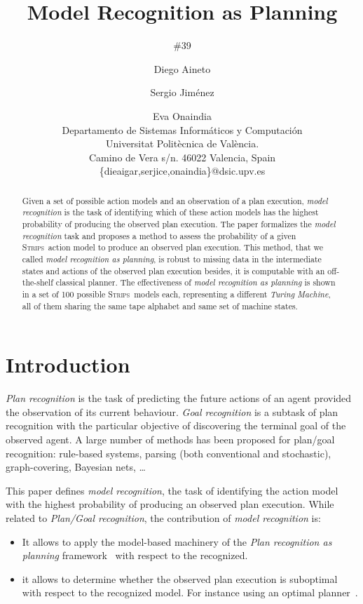 \documentclass[letterpaper]{article} %
\newcommand{\strips}{\textsc{Strips}}     %
\begin{document}
\title{Model Recognition as Planning}
\author{\#39}


\author{Diego Aineto\and Sergio Jim\'enez\and Eva Onaindia\\
{\small Departamento de Sistemas Inform\'aticos y Computaci\'on}\\
{\small Universitat Polit\`ecnica de Val\`encia.}\\
{\small Camino de Vera s/n. 46022 Valencia, Spain}\\
{\small \{dieaigar,serjice,onaindia\}@dsic.upv.es}}

\maketitle
\begin{abstract} 
Given a set of possible action models and an observation of a plan execution, {\em model recognition} is the task of identifying which of these action models has the highest probability of producing the observed plan execution. The paper formalizes the {\em model recognition} task and proposes a method to assess the probability of a given \strips\ action model to produce an observed plan execution. This method, that we called {\em model recognition as planning}, is robust to missing data in the intermediate states and actions of the observed plan execution besides, it is computable with an off-the-shelf classical planner. The effectiveness of {\em model recognition as planning} is shown in a set of 100 possible \strips\ models each, representing a different {\em Turing Machine}, all of them sharing the same tape alphabet and same set of machine states.
\end{abstract}


\section{Introduction}
\label{sec:section1}
{\em Plan recognition} is the task of predicting the future actions of an agent provided the observation of its current behaviour. {\em Goal recognition} is a subtask of plan recognition with the particular objective of discovering the terminal goal of the observed agent. A large number of methods has been proposed for plan/goal recognition: rule-based systems,  parsing  (both  conventional and stochastic), graph-covering, Bayesian nets, \ldots 

This paper defines {\em model recognition}, the task of identifying the action model with the highest probability of producing an observed plan execution. While related to {\em Plan/Goal recognition}, the contribution of {\em model recognition} is:
\begin{itemize}
\item It allows to apply the model-based machinery of the {\em Plan recognition as planning} framework~\cite{ramirez2012plan,ramirez2009plan} with respect to the recognized.
\item it allows to determine whether the observed plan execution is suboptimal with respect to the recognized model. For instance using an optimal planner~\cite{malte:optimalp:AAAI17}.  
\end{itemize}
\end{document}

